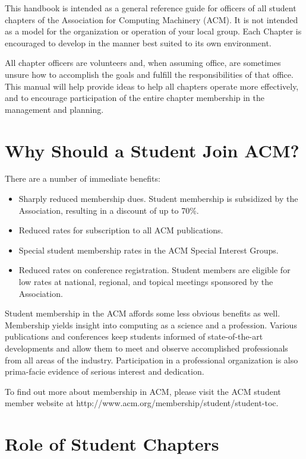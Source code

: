 This handbook is intended as a general reference guide for officers of all
student chapters of the Association for Computing Machinery (ACM). It is not
intended as a model for the organization or operation of your local group.
Each Chapter is encouraged to develop in the manner best suited to its own
environment.

All chapter officers are volunteers and, when assuming office, are sometimes
unsure how to accomplish the goals and fulfill the responsibilities of that
office. This manual will help provide ideas to help all chapters operate more
effectively, and to encourage participation of the entire chapter membership in
the management and planning.

\section{Why Should a Student Join ACM?}
\label{sec:sec03}

There are a number of immediate benefits:
  \begin{itemize}
    \item Sharply reduced membership dues. Student membership is subsidized by
          the Association, resulting in a discount of up to 70\%.
    \item Reduced rates for subscription to all ACM publications.
    \item Special student membership rates in the ACM Special Interest Groups.
    \item Reduced rates on conference registration. Student members are eligible
          for low rates at national, regional, and topical meetings sponsored by
          the Association.
  \end{itemize}

Student membership in the ACM affords some less obvious benefits as well.
Membership yields insight into computing as a science and a profession.
Various publications and conferences keep students informed of state-of-the-art
developments and allow them to meet and observe accomplished professionals from
all areas of the industry. Participation in a professional organization is also
prima-facie evidence of serious interest and dedication.

To find out more about membership in ACM, please visit the ACM student member
website at http://www.acm.org/membership/student/student-toc.

\section{Role of Student Chapters}
\label{sec:sec04}

